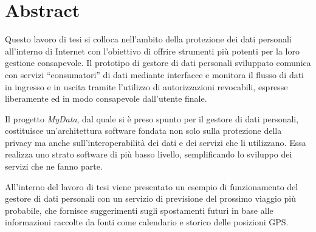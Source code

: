 \chapter*{Abstract}

\noindent Questo lavoro di tesi si colloca nell’ambito della protezione dei dati personali all’interno di Internet con l’obiettivo di offrire strumenti pi\`u potenti per la loro gestione consapevole. Il prototipo di gestore di dati personali sviluppato comunica con servizi “consumatori” di dati mediante interfacce e monitora il flusso di dati in ingresso e in uscita tramite l’utilizzo di autorizzazioni revocabili, espresse liberamente ed in modo consapevole dall’utente finale.

Il progetto \textit{MyData}, dal quale si \`e preso spunto per il gestore di dati personali, costituisce un’architettura software fondata non solo sulla protezione della privacy ma anche sull’interoperabilit\`a dei dati e dei servizi che li utilizzano. Essa realizza uno strato software di pi\`u basso livello, semplificando lo sviluppo dei servizi che ne fanno parte.

All’interno del lavoro di tesi viene presentato un esempio di funzionamento del gestore di dati personali con un servizio di previsione del prossimo viaggio pi\`u probabile, che fornisce suggerimenti sugli spostamenti futuri in base alle informazioni raccolte da fonti come calendario e storico delle posizioni GPS. 